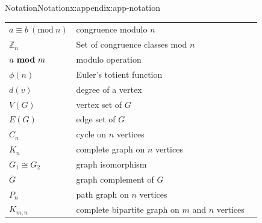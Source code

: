 \documentclass[oneside,10pt,]{book}
\numberwithin{equation}{section}
\newcommand{\Mod}[1]{\ \left(\mathrm{mod}\ #1\right)}
\begin{document}
\begin{appendixptx}{Notation}{}{Notation}{}{}{x:appendix:app-notation}
\begin{longtable}[l]{lp{}r}
\(a \equiv b \Mod{n}\)&congruence modulo \(n\)&\pageref{g:notation:id235986}\\
\(\mathbb{Z}_n\)&Set of congruence classes mod \(n\)&\pageref{g:notation:id228652}\\
\(a \ \mathrm{\bf mod} \ m\)&modulo operation&\pageref{g:notation:id239132}\\
\(\phi(n)\)&Euler's totient function&\pageref{g:notation:id253216}\\
\(d(v)\)&degree of a vertex&\pageref{g:notation:id488689}\\
\(V(G)\)&vertex set of \(G\)&\pageref{g:notation:id488857}\\
\(E(G)\)&edge set of \(G\)&\pageref{g:notation:id488865}\\
\(C_n\)&cycle on \(n\) vertices&\pageref{g:notation:id489692}\\
\(K_n\)&complete graph on \(n\) vertices&\pageref{g:notation:id489727}\\
\(G_1 \cong G_2\)&graph isomorphism&\pageref{g:notation:id490111}\\
\(\overline{G}\)&graph complement of \(G\)&\pageref{g:notation:id491015}\\
\(P_n\)&path graph on \(n\) vertices&\pageref{g:notation:id491185}\\
\(K_{m,n}\)&complete bipartite graph on \(m\) and \(n\) vertices&\pageref{g:notation:id492334}\\
\end{longtable}
\end{appendixptx}
%
%
\typeout{************************************************}
\typeout{************************************************}
%
\end{document}
